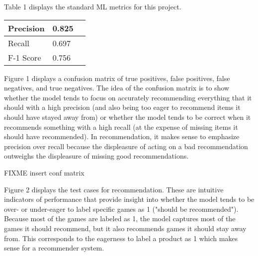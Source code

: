 \documentclass[10pt,twocolumn]{article}
\begin{document}
\begin{comment}
    Cite Ryan - people tend to like related games
    https://eis.ucsc.edu/papers/ryanEtAl_PeopleTendToLikeRelatedGames.pdf - cited

    Results also meet the goals of the project. Given a query game g and a potential recommendation r, the SVM outputs either a 0 (don't recommend) or a 1 (do recommend)

    Limitations include emphasis on word embeddings to train SVM algorithm. So, future work can include using NLP approaches like sentiment analysis, dependency parsing, etc. in order to further pinpoint game relatedness

    
\end{comment}

Table 1 displays the standard ML metrics for this project.

\begin{center}
\begin{tabular}{ | m{5em} | m{1cm}| m{1cm} | } 
  \hline
  Precision & 0.825 \\ 
  \hline
  Recall & 0.697 \\ 
  \hline
  F-1 Score & 0.756 \\ 
  \hline
\end{tabular}
\end{center}

Figure 1 displays a confusion matrix of true positives, false positives, false negatives, and true negatives. The idea of the confusion matrix is to show whether the model tends to focus on accurately recommending everything that it should with a high precision (and also being too eager to recommend items it should have stayed away from) or whether the model tends to be correct when it recommends something with a high recall (at the expense of missing items it should have recommended). In recommendation, it makes sense to emphasize precision over recall because the displeasure of acting on a bad recommendation outweighs the displeasure of missing good recommendations. 

FIXME insert conf matrix

Figure 2 displays the test cases for recommendation. These are intuitive indicators of performance that provide insight into whether the model tends to be over- or under-eager to label specific games as 1 ("should be recommended"). Because most of the games are labeled as 1, the model captures most of the games it should recommend, but it also recommends games it should stay away from. This corresponds to the eagerness to label a product as 1 which makes sense for a recommender system. 
\end{document}
